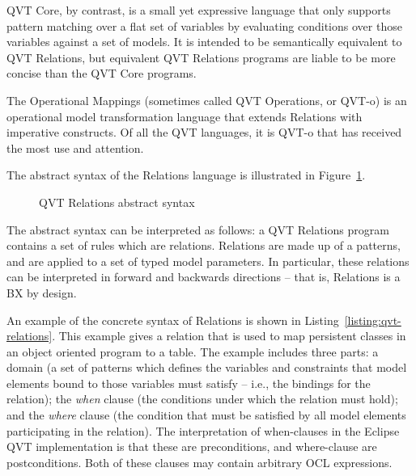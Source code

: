 QVT Core, by contrast, is a small yet expressive language that only supports pattern matching over a flat set of variables by evaluating conditions
over those variables against a set of models. It is intended to be semantically equivalent to QVT Relations, but equivalent QVT Relations programs are liable to be more concise than the QVT Core programs.

The Operational Mappings (sometimes called QVT Operations, or QVT-o) is an operational model transformation language that extends Relations with imperative constructs. Of all the QVT languages, it is QVT-o that has received the most use and attention.

The abstract syntax of the Relations language is illustrated in Figure~\ref{fig:qvt-as}.

\begin{figure}[htbp]
\label{fig:qvt-as}
\caption{QVT Relations abstract syntax}
\end{figure}

The abstract syntax can be interpreted as follows: a QVT Relations program contains a set of rules which are relations. Relations are made up of a patterns, and are applied to a set of typed model parameters. In particular, these relations can be interpreted in forward and backwards directions -- that is, Relations is a BX by design.

An example of the concrete syntax of Relations is shown in Listing~\ref{listing:qvt-relations}. This example gives a relation that is used to map persistent classes in an object oriented program to a table. The example includes three parts: a domain (a set of patterns which defines the variables and constraints that model elements bound to those variables must satisfy -- i.e., the bindings for the relation); the \textit{when} clause (the conditions under which the relation must hold); and the \textit{where} clause (the condition that must be satisfied by all model elements participating in the relation). The interpretation of when-clauses in the Eclipse QVT implementation is that these are preconditions, and where-clause are postconditions. Both of these clauses may contain arbitrary OCL expressions.

